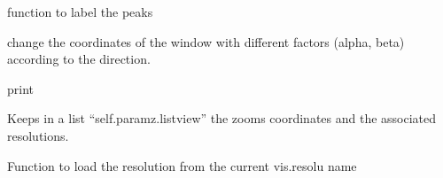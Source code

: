 \documentclass[letterpaper,10pt,openany,oneside]{sphinxmanual}
\begin{document}
\begin{fulllineitems}
\begin{fulllineitems}
\end{fulllineitems}


\begin{fulllineitems}
\label{rst/visu2d:Visu.display.DISPLAY.message}
function to label the peaks

\end{fulllineitems}


\begin{fulllineitems}
\label{rst/visu2d:Visu.display.DISPLAY.multzoom_coord}
change the coordinates of the window with different
factors (alpha, beta) according to the direction.

\end{fulllineitems}


\begin{fulllineitems}
\label{rst/visu2d:Visu.display.DISPLAY.pr}
print

\end{fulllineitems}


\begin{fulllineitems}
\label{rst/visu2d:Visu.display.DISPLAY.register_coordinates}
Keeps in a list ``self.paramz.listview'' the zooms coordinates and the associated resolutions.

\end{fulllineitems}


\begin{fulllineitems}
\label{rst/visu2d:Visu.display.DISPLAY.res2dd}
Function to load the resolution from the current vis.resolu name

\end{fulllineitems}



\end{fulllineitems}
\end{document}
